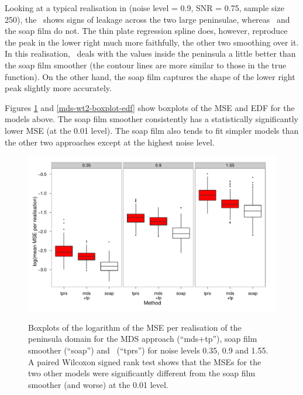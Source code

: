 Looking at a typical realisation in  (noise level = 0.9, SNR = 0.75, sample size 250), the \tprs\ shows signs of leakage across the two large peninsulae, whereas \mdsap\ and the soap film do not. The thin plate regression spline does, however, reproduce the peak in the lower right much more faithfully, the other two smoothing over it. In this realisation, \mdsap\ deals with the values inside the peninsula a little better than the soap film smoother (the contour lines are more similar to those in the true function). On the other hand, the soap film captures the shape of the lower right peak slightly more accurately.

Figures \ref{mds-wt2-boxplot} and \ref{mds-wt2-boxplot-edf} show boxplots of the MSE and EDF for the models above. The soap film smoother consistently has a statistically significantly lower MSE (at the 0.01 level). The soap film also tends to fit simpler models than the other two approaches except at the highest noise level.

\begin{figure}
\centering
\includegraphics[width=\textwidth]{mds/figs/mds-wt2-boxplot.pdf} \\
\caption{Boxplots of the logarithm of the MSE per realisation of the peninsula domain for the MDS approach (``mds+tp''), soap film smoother (``soap'') and \tprs\ (``tprs'') for noise levels 0.35, 0.9 and 1.55. A paired Wilcoxon signed rank test shows that the MSEs for the two other models were significantly different from the soap film smoother (and worse) at the 0.01 level.}
\label{mds-wt2-boxplot}
\end{figure}


